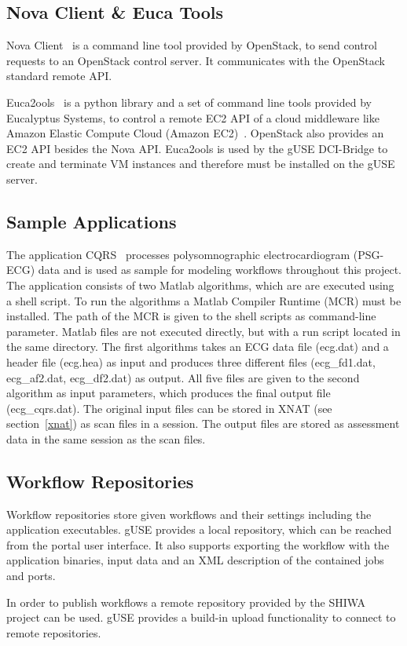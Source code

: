 \subsection{Nova Client \& Euca Tools}\label{euca}
Nova Client~\cite{nova} is a command line tool provided by OpenStack, to send control requests to an OpenStack control server. It communicates with the OpenStack standard remote API.

Euca2ools~\cite{eucatools} is a python library and a set of command line tools provided by Eucalyptus Systems, to control a remote EC2 API of a cloud middleware like Amazon Elastic Compute Cloud (Amazon EC2)~\cite{amazon}.
OpenStack also provides an EC2 API besides the Nova API.
Euca2ools is used by the gUSE DCI-Bridge to create and terminate VM instances and therefore must be installed on the gUSE server.

\subsection{Sample Applications}\label{applications}

The application CQRS~\cite{krefting10} processes polysomnographic electrocardiogram (PSG-ECG) data and is used as sample for modeling workflows throughout this project.
The application consists of two Matlab algorithms, which are are executed using a shell script.
To run the algorithms a Matlab Compiler Runtime (MCR) must be installed.
The path of the MCR is given to the shell scripts as command-line parameter.
Matlab files are not executed directly, but with a run script located in the same directory.
The first algorithms takes an ECG data file (ecg.dat) and a header file (ecg.hea) as input and produces three different files (ecg\_fd1.dat, ecg\_af2.dat, ecg\_df2.dat) as output.
All five files are given to the second algorithm as input parameters, which produces the final output file (ecg\_cqrs.dat).
The original input files can be stored in XNAT (see section~\ref{xnat}) as scan files in a session.
The output files are stored as assessment data in the same session as the scan files.

\subsection{Workflow Repositories}\label{repositories}

Workflow repositories store given workflows and their settings including the application executables.
gUSE provides a local repository, which can be reached from the portal user interface.
It also supports exporting the workflow with the application binaries, input data and an XML description of the contained jobs and ports.

In order to publish workflows a remote repository \cite{somnocqrs} provided by the SHIWA project can be used.
gUSE provides a build-in upload functionality to connect to remote repositories.